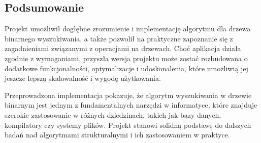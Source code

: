 \subsection{Podsumowanie}

Projekt umożliwił dogłębne zrozumienie i implementację algorytmu dla drzewa binarnego wyszukiwania, a także pozwolił na praktyczne zapoznanie się z zagadnieniami związanymi z operacjami na drzewach. Choć aplikacja działa zgodnie z wymaganiami, przyszła wersja projektu może zostać rozbudowana o dodatkowe funkcjonalności, optymalizacje i udoskonalenia, które umożliwią jej jeszcze lepszą skalowalność i wygodę użytkowania.

Przeprowadzona implementacja pokazuje, że algorytm wyszukiwania w drzewie binarnym jest jednym z fundamentalnych narzędzi w informatyce, które znajduje szerokie zastosowanie w różnych dziedzinach, takich jak bazy danych, kompilatory czy systemy plików. Projekt stanowi solidną podstawę do dalszych badań nad algorytmami strukturalnymi i ich zastosowaniem w praktyce.

\nocite{GitHubProject, GitHubProjectTemplate}
